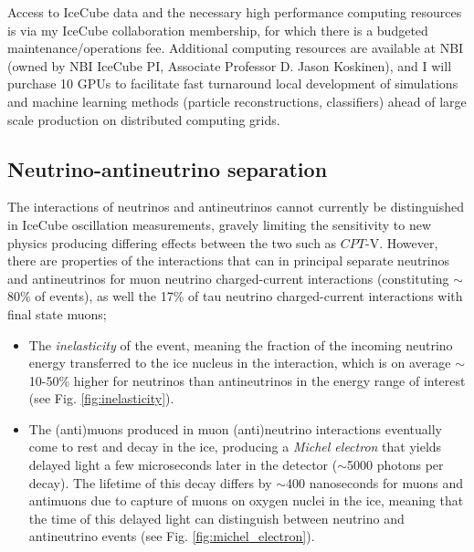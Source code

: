\documentclass[a4paper,11pt]{article}
\begin{document}
Access to IceCube data and the necessary high performance computing resources is via my IceCube collaboration membership, for which there is a budgeted maintenance/operations fee. Additional computing resources are available at NBI (owned by NBI IceCube PI, Associate Professor D. Jason Koskinen), and I will purchase 10 GPUs to facilitate fast turnaround local development of simulations and machine learning methods (particle reconstructions, classifiers) ahead of large scale production on distributed computing grids. \\

\subsection{Neutrino-antineutrino separation}

The interactions of neutrinos and antineutrinos cannot currently be distinguished in IceCube oscillation measurements, gravely limiting the sensitivity to new physics producing differing effects between the two such as $CPT$-V. However, there are properties of the interactions that can in principal separate neutrinos and antineutrinos for muon neutrino charged-current interactions (constituting $\sim$80\% of events), as well the 17\% of tau neutrino charged-current interactions with final state muons;

\begin{itemize}[leftmargin=*]
    \item The \textit{inelasticity} of the event, meaning the fraction of the incoming neutrino energy transferred to the ice nucleus in the interaction, which is on average $\sim$10-50\%  higher for neutrinos than antineutrinos in the energy range of interest (see Fig. \ref{fig:inelasticity}).
    \item The (anti)muons produced in muon (anti)neutrino interactions eventually come to rest and decay in the ice, producing a \textit{Michel electron} that yields delayed light a few microseconds later in the detector ($\sim$5000 photons per decay). The lifetime of this decay differs by $\sim$400 nanoseconds for muons and antimuons due to capture of muons on oxygen nuclei in the ice, meaning that the time of this delayed light can distinguish between neutrino and antineutrino events (see Fig. \ref{fig:michel_electron}). 
\end{itemize}
\end{document}
